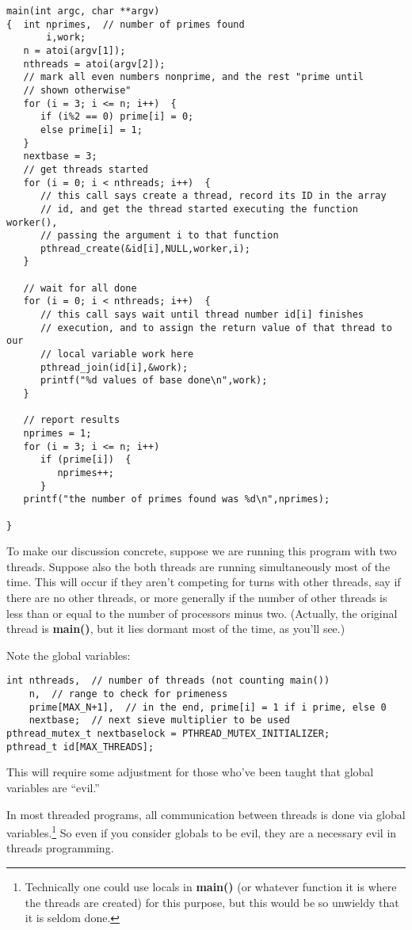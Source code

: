 \begin{Verbatim}
main(int argc, char **argv)
{  int nprimes,  // number of primes found
       i,work;
   n = atoi(argv[1]);
   nthreads = atoi(argv[2]);
   // mark all even numbers nonprime, and the rest "prime until
   // shown otherwise"
   for (i = 3; i <= n; i++)  {
      if (i%2 == 0) prime[i] = 0;
      else prime[i] = 1;
   }
   nextbase = 3;
   // get threads started
   for (i = 0; i < nthreads; i++)  {
      // this call says create a thread, record its ID in the array
      // id, and get the thread started executing the function worker(),
      // passing the argument i to that function
      pthread_create(&id[i],NULL,worker,i);
   }

   // wait for all done
   for (i = 0; i < nthreads; i++)  {
      // this call says wait until thread number id[i] finishes
      // execution, and to assign the return value of that thread to our
      // local variable work here
      pthread_join(id[i],&work);
      printf("%d values of base done\n",work);
   }

   // report results
   nprimes = 1;
   for (i = 3; i <= n; i++)
      if (prime[i])  {
         nprimes++;
      }
   printf("the number of primes found was %d\n",nprimes);

}
\end{Verbatim}

To make our discussion concrete, suppose we are running this program
with two threads.  Suppose also the both threads are running
simultaneously most of the time.  This will occur if they aren't
competing for turns with other threads, say if there are no other
threads, or more generally if the number of other threads is
less than or equal to the number of processors minus two.  (Actually,
the original thread is {\bf main()}, but it lies dormant most of the
time, as you'll see.)

Note the global variables:

\begin{Verbatim}
int nthreads,  // number of threads (not counting main())
    n,  // range to check for primeness
    prime[MAX_N+1],  // in the end, prime[i] = 1 if i prime, else 0
    nextbase;  // next sieve multiplier to be used
pthread_mutex_t nextbaselock = PTHREAD_MUTEX_INITIALIZER;
pthread_t id[MAX_THREADS];
\end{Verbatim}

This will require some adjustment for those who've been taught that
global variables are ``evil.''

In most threaded programs, all communication between threads is done via
global variables.\footnote{Technically one could use locals in {\bf
main()} (or whatever function it is where the threads are created) for
this purpose, but this would be so unwieldy that it is seldom done.} So
even if you consider globals to be evil, they are a necessary evil in
threads programming.

